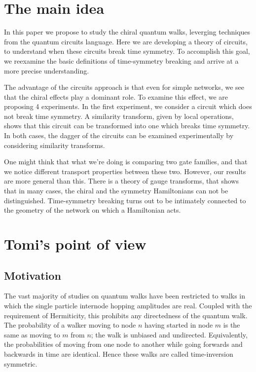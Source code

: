 \documentclass[aps,pra,12pt,nofootinbib,superscriptaddress,longbibliography,showpacs]{revtex4-1}
\theoremstyle{plain}
\theoremstyle{definition}
\begin{document}
\section{The main idea} 

In this paper we propose to study the chiral quantum walks, leverging techniques from the quantum circuits language.  Here we are developing a theory of circuits, to understand when these circuits break time symmetry.  To accomplish this goal, we reexamine the basic definitions of time-symmetry breaking and arrive at a more precise understanding.  

The advantage of the circuits approach is that even for simple networks, we see
that the chiral effects play a dominant role.  To examine this effect,
we are proposing 4 experiments.  In the first experiment, we consider
a circuit which does not break time symmetry.  A similarity transform,
given by local operations, shows that this circuit can be transformed
into one which breaks time symmetry.  In both cases, the dagger of the
circuits can be examined experimentally by considering similarity
transforms.

One might think that what we're doing is comparing two gate families, and that we notice different transport properties between these two.  However, our results are more general than this.  There is a theory of gauge transforms, that shows that in many cases, the chiral and the symmetry Hamiltonians can not be distinguished.  Time-symmetry breaking turns out to be intimately connected to the geometry of the network on which a Hamiltonian acts.  

\section{Tomi's point of view}
\subsection{Motivation}
The vast majority of studies on quantum walks have been restricted to walks in which the single particle internode hopping amplitudes are real. Coupled with the requirement of Hermiticity, this prohibits any directedness of the quantum walk. The probability of a walker moving to node $n$ having started in node $m$ is the same as moving to $m$ from $n$; the walk is unbiased and undirected. Equivalently, the probabilities of moving from one node to another while going forwards and backwards in time are identical. Hence these walks are called time-inversion symmetric.
\end{document}

